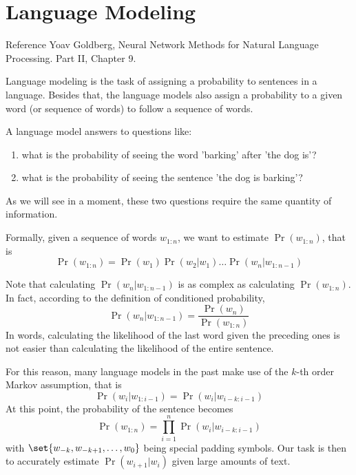\chapter{Language Modeling}

\begin{note}{Reference}
    Yoav Goldberg, Neural Network Methods for Natural Language Processing.\cite{goldberg2017neural}
    Part II, Chapter 9.
\end{note}

Language modeling is the task of assigning a probability to sentences in a language. Besides that, the language models also assign a probability to a given word (or sequence of words) to follow a sequence of words.

\begin{example}{}
    A language model answers to questions like:
    \begin{enumerate}
        \item what is the probability of seeing the word 'barking' after 'the dog is'?
        \item what is the probability of seeing the sentence 'the dog is barking'?
    \end{enumerate}
    As we will see in a moment, these two questions require the same quantity of information.
\end{example}

Formally, given a sequence of words $w_{1:n}$, we want to estimate $\Pr(w_{1:n})$, that is
$$
\Pr(w_{1:n}) = \Pr(w_{1})\Pr(w_{2}|w_{1})\dots \Pr(w_{n}|w_{1:n-1})
$$

\begin{observation}{}
    Note that calculating $\Pr(w_{n}|w_{1:n-1})$ is as complex as calculating $\Pr(w_{1:n})$. In fact, according to the definition of conditioned probability,
    $$
    \Pr(w_{n}|w_{1:n-1}) = \frac{\Pr(w_{n})}{\Pr(w_{1:n})}
    $$
    In words, calculating the likelihood of the last word given the preceding ones is not easier than calculating the likelihood of the entire sentence.
\end{observation}

For this reason, many language models in the past make use of the $k$-th order Markov assumption, that is
$$
\Pr(w_{i}|w_{1:i-1}) = \Pr(w_{i}|w_{i-k:i-1})
$$
At this point, the probability of the sentence becomes
$$
\Pr(w_{1:n}) = \prod_{i=1}^{n}\Pr(w_{i}|w_{i-k:i-1})
$$
with $\set{w_{-k}, w_{-k+1},\dots, w_{0}}$ being special padding symbols. Our task is then to accurately estimate $\Pr(w_{i+1}|w_{i})$ given large amounts of text.


